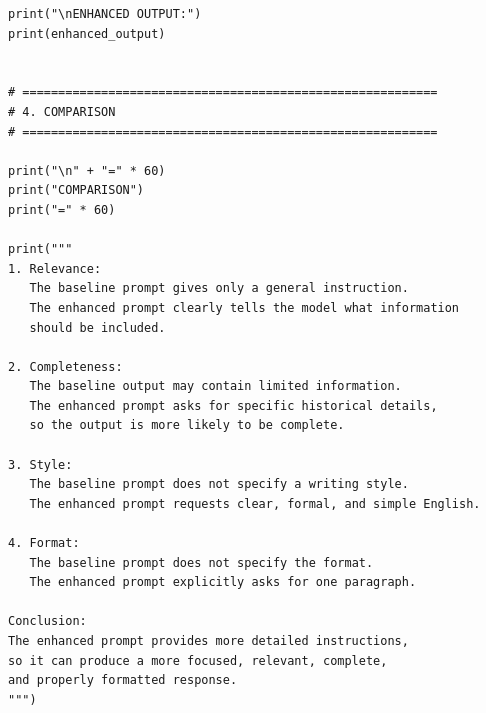 \documentclass[10pt,a4paper]{article}
\begin{document}
\begin{lstlisting}[style=code]
print("\nENHANCED OUTPUT:")
print(enhanced_output)


# ==========================================================
# 4. COMPARISON
# ==========================================================

print("\n" + "=" * 60)
print("COMPARISON")
print("=" * 60)

print("""
1. Relevance:
   The baseline prompt gives only a general instruction.
   The enhanced prompt clearly tells the model what information
   should be included.

2. Completeness:
   The baseline output may contain limited information.
   The enhanced prompt asks for specific historical details,
   so the output is more likely to be complete.

3. Style:
   The baseline prompt does not specify a writing style.
   The enhanced prompt requests clear, formal, and simple English.

4. Format:
   The baseline prompt does not specify the format.
   The enhanced prompt explicitly asks for one paragraph.

Conclusion:
The enhanced prompt provides more detailed instructions,
so it can produce a more focused, relevant, complete,
and properly formatted response.
""")
\end{lstlisting}
\end{document}
